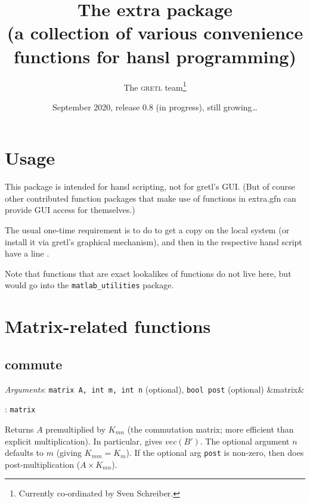 \documentclass[11pt,english]{article}
\newcommand{\noun}[1]{\textsc{#1}}
\newcommand{\ArgRet}[2]{%
  {\it Arguments}: {#1}%
  \ifx&#2&%
  \else
  \par\smallskip\noindent {\it Return type}: \texttt{#2}
  \fi%
  \par\medskip\par%
  }
\begin{document}
\title{The extra package\\
(a collection of various convenience functions for hansl programming) }

\date{September 2020, release 0.8 (in progress), still growing\ldots }

\author{The \noun{gretl} team\thanks{Currently co-ordinated by Sven Schreiber.}}

\maketitle
\tableofcontents{}

\section{Usage}

This package is intended for hansl scripting, not for gretl's GUI.
(But of course other contributed function packages that make use of
functions in extra.gfn can provide GUI access for themselves.)

The usual one-time requirement is to do 
to get a copy on the local system (or install it via gretl's graphical
mechanism), and then in the respective hansl script have a line .

Note that functions that are exact lookalikes of 
functions do not live here, but would go into the
\texttt{matlab\_utilities} package.


\section{Matrix-related functions}

\subsection{commute}

\ArgRet{\texttt{matrix A, int m, int n} (optional), \texttt{bool
post} (optional)}{matrix}

Returns $A$ premultiplied by $K_{mn}$ (the commutation matrix; more
efficient than explicit multiplication). In particular,  gives $vec(B')$. The optional argument $n$ defaults to
$m$ (giving $K_{mm}=K_{m}$). If the optional arg \texttt{post} is
non-zero, then does post-multiplication ($A\times K_{mn}$).
\end{document}
